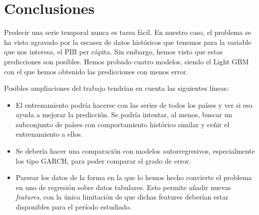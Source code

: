\documentclass[12pt]{article}
\begin{document}
\begin{figure}[H]
\end{figure}

\newpage

\section{Conclusiones}

Predecir una serie temporal nunca es tarea fácil. En nuestro caso, el problema se ha visto agravado por la escasez de datos históricos que tenemos para la variable que nos interesa, el PIB per cápita. Sin embargo, hemos visto que estas predicciones son posibles. Hemos probado cuatro modelos, siendo el Light GBM con el que hemos obtenido las predicciones con menos error.

Posibles ampliaciones del trabajo tendrían en cuenta las siguientes líneas:
\begin{itemize}
    \item El entrenamiento podría hacerse con las series de todos los países y ver si eso ayuda a mejorar la predicción. Se podría intentar, al menos, buscar un subconjunto de países con comportamiento histórico similar y ceñir el entrenamiento a ellos.
    \item Se debería hacer una comparación con modelos autorregresivos, especialmente los tipo GARCH, para poder comparar el grado de error.
    \item Parsear los datos de la forma en la que lo hemos hecho convierte el problema en uno de regresión sobre datos tabulares. Esto permite añadir nuevas \textit{features}, con la única limitación de que dichas features deberían estar disponibles para el período estudiado.
\end{itemize}
\end{document}

